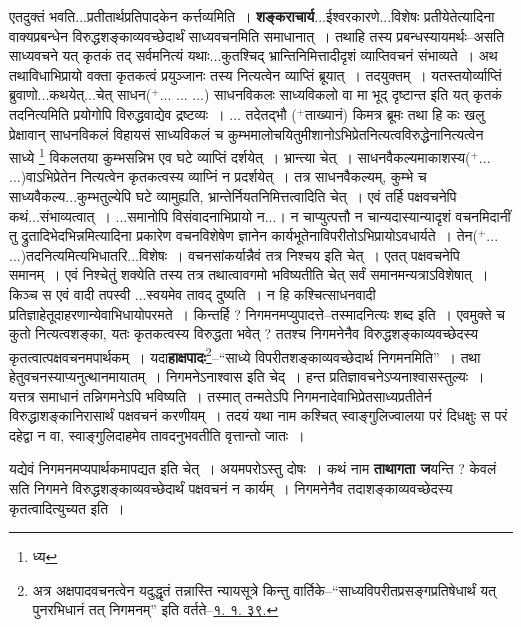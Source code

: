 \documentclass[article,12pt,a4paper]{memoir}
\newcommand{\add}[1]{($^{+}$#1)}
\begin{document}
	  \pstart एतदुक्तं भवति...प्रतीतार्थप्रतिपादकेन कर्त्तव्यमिति । \textbf{शङ्कराचार्य}...ईश्वरकारणे...विशेषः प्रतीयेतेत्यादिना वाक्यप्रबन्धेन विरुद्धशङ्काव्यवच्छेदार्थं साध्यवचनमिति समाधानात् । तथाहि तस्य प्रबन्धस्यायमर्थः--असति साध्यवचने यत् कृतकं तद् सर्वमनित्यं  \leavevmode{} यथाः...कुतश्चिद् भ्रान्तिनिमित्तादीदृशं व्याप्तिवचनं संभाव्यते । अथ तथाविधाभिप्रायो वक्ता कृतकत्वं प्रयुञ्जानः तस्य नित्यत्वेन व्याप्तिं ब्रूयात् । तदयुक्तम् । यतस्तयोर्व्याप्तिं ब्रुवाणो...कथयेत्...चेत् साधन\add{... ... ...} साधनविकलः साध्यविकलो वा मा भूद् दृष्टान्त इति यत् कृतकं तदनित्यमिति प्रयोगोपि विरुद्धवाद्येव द्रष्टव्यः । ... तदेतद्भौ \add{ताख्यानं} किमत्र ब्रूमः तथा हि कः खलु प्रेक्षावान् साधनविकलं विहायसं साध्यविकलं च कुम्भमालोचयितुमीशानोऽभिप्रेतनित्यत्वविरुद्धेनानित्यत्वेन साध्ये \footnote{ध्य} विकलतया कुम्भसन्निभ एव घटे व्याप्तिं दर्शयेत् । भ्रान्त्या चेत् । साधनवैकल्यमाकाशस्य\add{... ...}वाऽभिप्रेतेन नित्यत्वेन कृतकत्वस्य व्याप्निं न प्रदर्शयेत् । तत्र साधनवैकल्यम्, कुम्भे च साध्यवैकल्य...कुम्भतुल्येपि घटे व्यामुह्यति, भ्रान्तेर्नियतनिमित्तत्वादिति चेत् । एवं तर्हि पक्षवचनेपि कथं...संभाव्यत्वात् । ...समानोपि विसंवादनाभिप्रायो न...। न चाप्युत्पत्तौ न चान्यदास्यान्यादृशं वचनमिदानीं तु द्रुतादिभेदभिन्नमित्यादिना प्रकारेण वचनविशेषेण ज्ञानेन कार्यभूतेनाविपरीतोऽभिप्रायोऽवधार्यते । तेन\add{... ...}तदनित्यमित्यभिधातरि...विशेषः । वचनसांकर्यान्नैवं तत्र निश्चय इति चेत् । एतत् पक्षवचनेपि समानम् । एवं निश्चेतुं शक्येति तस्य तत्र तथात्वावगमो भविष्यतीति चेत् सर्वं समानमन्यत्राऽविशेषात् । किञ्च स एवं वादी तपस्वी ...\leavevmode{}स्वयमेव तावद् दुष्यति । न हि कश्चित्साधनवादी प्रतिज्ञाहेतूदाहरणान्येवाभिधायोपरमते । किन्तर्हि ? निगमनमप्युपादत्ते--तस्मादनित्यः शब्द इति । एवमुक्ते च कुतो नित्यत्वशङ्का, यतः कृतकत्वस्य विरुद्धता भवेत् ? ततश्च निगमनेनैव विरुद्धशङ्काव्यवच्छेदस्य कृतत्वात्पक्षवचनमपार्थकम् । यदा\textbf{हाक्षपादः}\footnote{अत्र अक्षपादवचनत्वेन यदुद्धृतं तन्नास्ति न्यायसूत्रे किन्तु वार्तिके--“साध्यविपरीतप्रसङ्गप्रतिषेधार्थं यत् पुनरभिधानं तत् निगमनम्” इति वर्तते--\href{http://http://sarit.indology.info/?cref=}{१. १. ३९.}}\---“साध्ये विपरीतशङ्काव्यवच्छेदार्थ निगमनमिति” । तथा हेतुवचनस्याप्यनुत्थानमायातम् । निगमनेऽनाश्वास इति चेद् । हन्त प्रतिज्ञावचनेऽप्यनाश्वासस्तुल्यः । यत्तत्र समाधानं तन्निगमनेऽपि भविष्यति । तस्मात् तन्मतेऽपि निगमनादेवाभिप्रेतसाध्यप्रतीतेर्न विरुद्धाशङ्कानिरासार्थं पक्षवचनं करणीयम् । तदयं यथा नाम कश्चित् स्वाङ्गुलिज्वालया परं दिधक्षुः स परं दहेद्वा न वा, स्वाङ्गुलिदाहमेव तावदनुभवतीति वृत्तान्तो जातः ।
	\pend
      

	  \pstart यद्येवं निगमनमप्यपार्थकमापद्यत इति चेत् । अयमपरोऽस्तु दोषः । कथं नाम \textbf{ताथागता ज}यन्ति ? केवलं सति निगमने विरुद्धशङ्काव्यवच्छेदार्थं पक्षवचनं न कार्यम् । निगमनेनैव तदाशङ्काव्यवच्छेदस्य कृतत्वादित्युच्यत इति ।
	\pend
      
\end{document}
